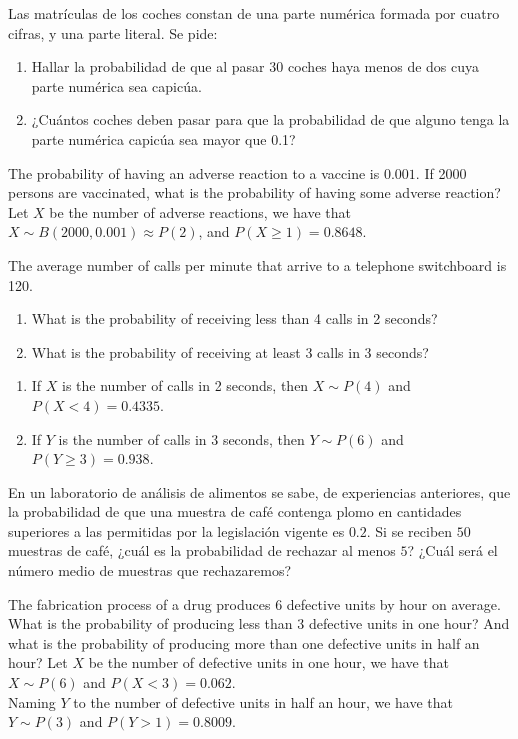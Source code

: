 {Las matrículas de los coches constan de una parte numérica formada por cuatro cifras, y una parte literal. Se pide:

\begin{enumerate}
\item  Hallar la probabilidad de que al pasar 30 coches haya menos de dos cuya parte numérica sea capicúa.
\item  ¿Cuántos coches deben pasar para que la probabilidad de que alguno tenga la parte numérica capicúa sea mayor
que 0.1?
\end{enumerate}
}
{}
{}


{The probability of having an adverse reaction to a vaccine is $0.001$. 
If 2000 persons are vaccinated, what is the probability of having some adverse reaction?
}
{Let $X$ be the number of adverse reactions, we have that $X\sim B(2000,0.001)\approx P(2)$, and $P(X\geq 1)=0.8648$.
}
{}


{The average number of calls per minute that arrive to a telephone switchboard is 120. 
\begin{enumerate}
\item What is the probability of receiving less than 4 calls in 2 seconds?
\item What is the probability of receiving at least 3 calls in 3 seconds?
\end{enumerate}
}
{
\begin{enumerate}
\item If $X$ is the number of calls in 2 seconds, then $X\sim P(4)$ and $P(X<4)=0.4335$.
\item If $Y$ is the number of calls in 3 seconds, then $Y\sim P(6)$ and $P(Y\geq 3)=0.938$.
\end{enumerate}
}
{}


{En un laboratorio de análisis de alimentos se sabe, de experiencias anteriores, que la probabilidad de que una muestra de café contenga plomo en cantidades superiores a las permitidas por la legislación vigente es $0.2$. Si se reciben $50$ muestras de café, ¿cuál es la probabilidad de rechazar al menos $5$?
¿Cuál será el número medio de muestras que rechazaremos?
}
{}
{}


{The fabrication process of a drug produces 6 defective units by hour on average.
What is the probability of producing less than 3 defective units in one hour?
And what is the probability of producing more than one defective units in half an hour?}
{Let $X$ be the number of defective units in one hour, we have that $X\sim P(6)$ and $P(X<3)=0.062$.\\
Naming $Y$ to the number of defective units in half an hour, we have that $Y\sim P(3)$ and $P(Y>1)=0.8009$.}
{}


